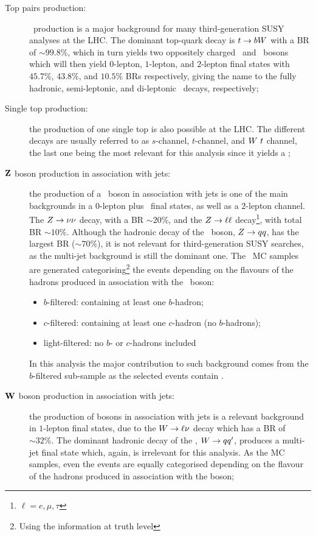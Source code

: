 		\begin{description}

			\item [Top pairs production:] \ttbar\ production is a major background for many third-generation \ac{SUSY} analyses at the LHC. The dominant top-quark decay is $t \rightarrow b W$ with a \ac{BR} of $\sim 99.8\%$, which in turn yields two oppositely charged \bjs\ and \Wboson\ bosons which will then yield $0$-lepton, $1$-lepton, and $2$-lepton final states with $45.7\%$, $43.8\%$, and $10.5\%$ \acp{BR} respectively, giving the name to the fully hadronic, semi-leptonic, and di-leptonic \ttbar\ decays, respectively; 
			
			\item [Single top production:] the production of one single top is also possible at the LHC. The different decays are usually referred to as $s$-channel, $t$-channel, and $W\ t$ channel, the last one being the most relevant for this analysis since it yields a \Wboson; 

			\item [$\mathbf{Z}$ boson production in association with jets:] the production of a \Zboson\ boson in association with jets is one of the main backgrounds in a $0$-lepton plus \met\ final states, as well as a $2$-lepton channel. The $Z \rightarrow \nu \nu$ decay, with a \ac{BR} $\sim 20\%$, and the $Z \rightarrow \ell \ell$ decay\footnote{$\ell = e,\mu,\tau$}, with total \ac{BR} $\sim 10\%$. Although the hadronic decay of the \Zboson\ boson, $Z \rightarrow qq$, has the largest \ac{BR} ($\sim 70\%$), it is not relevant for third-generation \ac{SUSY} searches, as the multi-jet background is still the dominant one. The \Zjets\ \ac{MC} samples are generated categorising\footnote{Using the information at truth level} the events depending on the flavours of the hadrons produced in association with the \Zboson\ boson:
			\begin{itemize}
				\item $b$-filtered: containing at least one $b$-hadron;
				\item $c$-filtered: containing at least one $c$-hadron (no $b$-hadrons);
				\item light-filtered: no $b$- or $c$-hadrons included 
			\end{itemize} 
			In this analysis the major contribution to such background comes from the $b$-filtered sub-sample as the selected events contain \bjs.

			\item [$\mathbf{W}$ boson production in association with jets:] the production of \Wboson bosons in association with jets is a relevant background in $1$-lepton final states, due to the $W \rightarrow \ell\nu$ decay which has a \ac{BR} of $\sim 32\%.$ The dominant hadronic decay of the \Wboson, $W \rightarrow qq'$, produces a multi-jet final state which, again, is irrelevant for this analysis. As the \Zjets \ac{MC} samples, even the \Wjets events are equally categorised depending on the flavour of the hadrons produced in association with the \Wboson boson;


\end{description}
